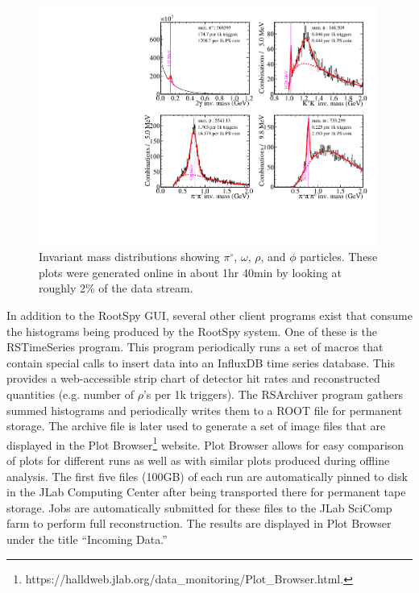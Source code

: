 \begin{figure}[tbp]
\begin{center}
\includegraphics[width=0.99\textwidth]{figures/online_monitoring_PID.pdf}
\caption{\label{fig:online_monitoring_PID}Invariant mass distributions showing $\pi^\circ$, $\omega$, $\rho$, and $\phi$ particles. These plots were generated online in about 1hr 40min by looking at roughly 2\% of the data stream.}   
\end{center}  
\end{figure}

In addition to the RootSpy GUI, several other client programs exist that consume the histograms being produced by the RootSpy system. One of these is the RSTimeSeries program. This program periodically runs a set of macros that contain special calls to insert data into an InfluxDB time series database. This provides a web-accessible strip chart of detector hit rates and reconstructed quantities (e.g. number of $\rho$'s per 1k triggers). The RSArchiver program gathers summed histograms and periodically writes them to a ROOT file for permanent storage. The archive file is later used to generate a set of image files that are displayed in the Plot Browser\footnote{https://halldweb.jlab.org/data\_monitoring/Plot\_Browser.html.} website. Plot Browser allows for easy comparison of plots for different runs as well as with similar plots produced during offline analysis. The first five files (100GB) of each run are automatically pinned to disk in the JLab Computing Center after being transported there for permanent tape storage. Jobs are automatically submitted for these files to the JLab SciComp farm to perform full reconstruction. The results are displayed in Plot Browser under the title ``Incoming Data.''


